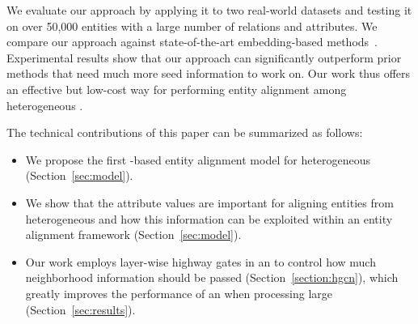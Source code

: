 We evaluate our approach by applying it to two real-world datasets and testing it on over 50,000 entities with a large number of relations
and attributes. We compare our approach against state-of-the-art embedding-based
methods~\cite{hao2016joint,chen2016multilingual,sun2017cross,zhu2017iterative}. Experimental results show that our approach can
significantly outperform prior methods that need much more seed information to work on. Our work thus offers an effective but low-cost way
for performing entity alignment among heterogeneous \KGs.



	
	The technical contributions of this paper can be summarized as follows:
	\begin{itemize}
		\item We propose the first \RGCN-based entity alignment model for heterogeneous \KGs (Section~\ref {sec:model}).
		
        \item We show that the attribute values are important for aligning entities from heterogeneous \KGs and how this information can
            be exploited within an entity alignment framework (Section~\ref{sec:model}).

		\item Our work employs layer-wise highway gates in an \RGCN to control how much neighborhood information should be
passed (Section~\ref{section:hgcn}), which greatly improves the performance of an \RGCN when processing
large \KGs (Section~\ref{sec:results}).
		
		
	\end{itemize}
